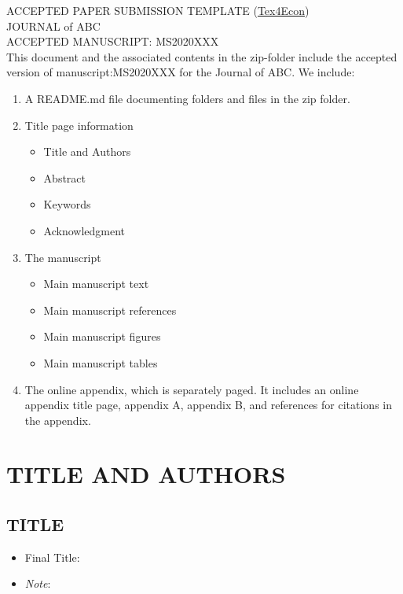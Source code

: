 \documentclass[12pt,english]{article}
\begin{document}
\thispagestyle{empty}
\begingroup
  \doublespacing
  \centering
  \LARGE ACCEPTED PAPER SUBMISSION TEMPLATE (\href{https://fanwangecon.github.io/Tex4Econ}{Tex4Econ})\\[0.25em]
  \LARGE JOURNAL of ABC \\[0.25em]
  \LARGE ACCEPTED MANUSCRIPT: MS2020XXX \\[1.0em]
\endgroup
This document and the associated contents in the zip-folder include the accepted version of manuscript:MS2020XXX for the Journal of ABC. We include:
\begin{enumerate}
    \item A README.md file documenting folders and files in the zip folder.
    \item Title page information
    \begin{itemize}
        \item Title and Authors
        \item Abstract
        \item Keywords
        \item Acknowledgment
    \end{itemize}
    \item The manuscript
    \begin{itemize}
        \item Main manuscript text
        \item Main manuscript references
        \item Main manuscript figures
        \item Main manuscript tables
    \end{itemize}    
    \item The online appendix, which is separately paged. It includes an online appendix title page, appendix A, appendix B, and references for citations in the appendix.
\end{enumerate}
\clearpage


\setcounter{page}{1}

\section*{TITLE AND AUTHORS}
\subsection*{TITLE}
\begin{itemize}[label={}, leftmargin=*]
    \item Final Title: \textbf{\PAPERTITLE}
    \item[] \emph{Note}: \blindtext
\end{itemize}
\end{document}
